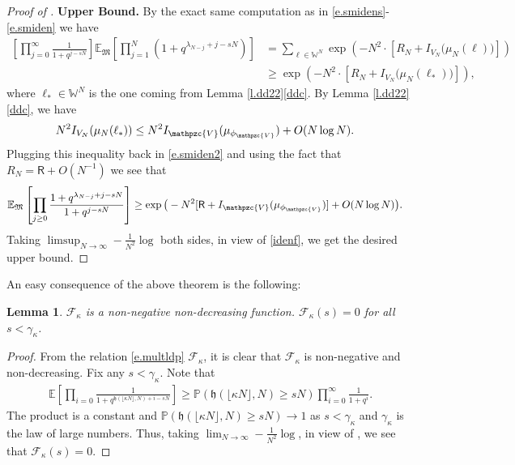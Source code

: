 \documentclass[reqno,11pt]{amsart}
\renewcommand{\Pr}{\mathbb{P}}
\newcommand{\lln}{\gamma_\kappa}
\numberwithin{equation}{section}
\newtheorem{lemma}[proposition]{Lemma}
\theoremstyle{definition}
\begin{document}
\begin{proof}[Proof of ]
\medskip

\noindent\textbf{Upper Bound.}  By the exact same computation as in \eqref{e.smidens}-\eqref{e.smiden} we have 
\begin{equation}\label{e.smiden2}
    \begin{aligned}
    \left[\prod_{j=0}^\infty \frac{1}{1+q^{j-sN}}\right]\mathbb{E}_{\mathfrak{M}}\left[\prod_{j=1}^N(1+q^{\lambda_{N-j}+j-sN})\right] 
   & = \sum_{\ell\in \mathbb{W}^N} \exp\left(-N^2\cdot [R_N+I_{V_N}\big(\mu_N(\ell)\big)]\right) \\ & \ge \exp\left(-N^2\cdot [R_N+I_{V_N}\big(\mu_N(\ell_*)\big)]\right),
\end{aligned}
\end{equation}
where $\ell_*\in \mathbb{W}^N$ is the one coming from Lemma \ref{l.dd22}\ref{ddc}. By Lemma \ref{l.dd22}\ref{ddc},  we have
\begin{align*}
    N^2 I_{V_N}(\mu_N(\ell_*)) &  \le N^2 I_{\mathpzc{V}}(\mu_{\phi_{\mathpzc{V}}}) +O(N\log N).
\end{align*}
Plugging this inequality back in \eqref{e.smiden2} and using the fact that $R_N=\mathsf{R}+O(N^{-1})$ we see that 
\begin{equation*}
    \begin{aligned}
\mathbb{E}_{\mathfrak{M}}\left[\prod_{j\geq 0}\frac{1+q^{\lambda_{N-j}+j-sN}}{1+q^{j-sN}}\right]  
   & \ge  \exp\big(- N^2[\mathsf{R}+I_{{\mathpzc{V}}}(\mu_{\phi_{\mathpzc{V}}})]+O(N\log N)\big).
\end{aligned}
\end{equation*}
Taking $\limsup_{N\to \infty} -\frac1{ N^2}\log$ both sides, in view of \eqref{idenf}, we get the desired upper bound. 
\end{proof}

An easy consequence of the above theorem is the following:

\begin{lemma}\label{l.fha} $\mathcal{F}_\kappa$ is a non-negative non-decreasing function. $\mathcal{F}_\kappa(s)=0$ for all $s<\lln$.
\end{lemma}
\begin{proof} From the relation \eqref{e.multldp} $\mathcal{F}_\kappa$, it is clear that $\mathcal{F}_\kappa$ is non-negative and non-decreasing. Fix any $s<\lln$. Note that
\begin{align*}
    \mathbb{E} \left[\prod_{i= 0}\frac{1}{1+ q^{\mathfrak{h}(\lfloor \kappa N \rfloor,N)+i-sN}}\right] \ge \Pr(\mathfrak{h}(\lfloor \kappa N \rfloor,N) \ge s N) \prod_{i=0}^{\infty} \frac{1}{1+q^i}.
\end{align*}  
The product is a constant and $\Pr(\mathfrak{h}(\lfloor \kappa N \rfloor,N) \ge s N) \to 1$ as $s<\lln$ and $\lln$ is the law of large numbers. Thus, taking $\lim_{N\to\infty} -\frac1{N^2}\log$, in view of , we see that $\mathcal{F}_\kappa(s)=0$.
\end{proof}
\end{document}
